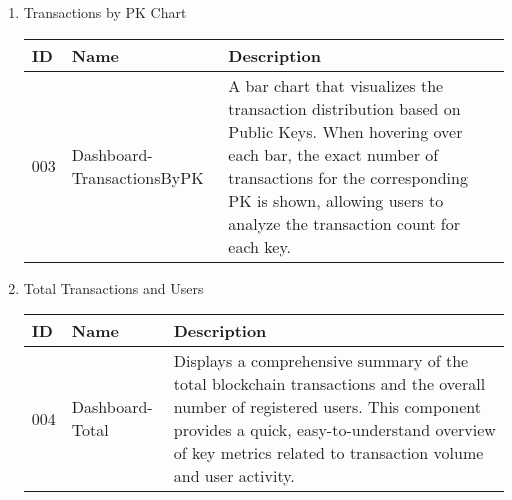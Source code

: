 \documentclass[conference]{IEEEtran}
\begin{document}
\begin{enumerate}[itemsep=2ex, parsep=1ex]
\begin{enumerate}[itemsep=2ex, parsep=1ex]
	      	\item Transactions by PK Chart
	      	      \begin{table}[h!]
	      	      	\def\arraystretch{1.24} \small
	      	      	\begin{tabular}{|p{1.2cm}|p{2.5cm}|p{4.0cm}|}
	      	      		\hline
	      	      		ID  & Name                       & Description                                                                                                                                                                                                                                   \\
	      	      		\hline
	      	      		003 & Dashboard-TransactionsByPK & A bar chart that visualizes the transaction distribution based on Public Keys. When hovering over each bar, the exact number of transactions for the corresponding PK is shown, allowing users to analyze the transaction count for each key. \\
	      	      		\hline
	      	      	\end{tabular}
	      	      \end{table}
	      	      
	      	\item Total Transactions and Users
	      	      \begin{table}[h!]
	      	      	\def\arraystretch{1.24} \small
	      	      	\begin{tabular}{|p{1.2cm}|p{2.5cm}|p{4.0cm}|}
	      	      		\hline
	      	      		ID  & Name            & Description                                                                                                                                                                                                                                    \\
	      	      		\hline
	      	      		004 & Dashboard-Total & Displays a comprehensive summary of the total blockchain transactions and the overall number of registered users. This component provides a quick, easy-to-understand overview of key metrics related to transaction volume and user activity. \\
	      	      		\hline
	      	      	\end{tabular}
	      	      \end{table}
	      	              
	      	      \vspace{10cm}
	      	      

\end{enumerate}
\end{enumerate}
\end{document}
